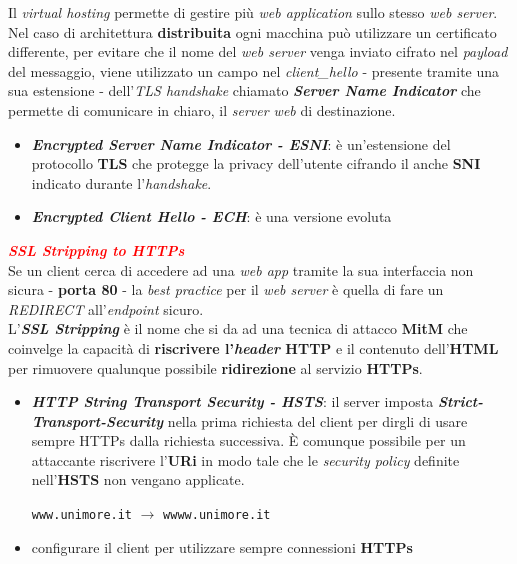 \begin{flushleft}
    Il \textit{virtual hosting} permette di gestire più \textit{web application} sullo stesso \textit{web server}. Nel caso di architettura \textbf{distribuita} ogni macchina può utilizzare un certificato differente, per evitare che il nome del \textit{web server} venga inviato cifrato nel \textit{payload} del messaggio, viene utilizzato un campo nel \textit{client\_hello} - presente tramite una sua estensione - dell'\textit{TLS handshake} chiamato \textbf{\textit{Server Name Indicator}} che permette di comunicare in chiaro, il \textit{server web} di destinazione.
    \begin{itemize}[nosep]
        \item \textbf{\textit{Encrypted Server Name Indicator - ESNI}}: è un'estensione del protocollo \textbf{TLS} che protegge la privacy dell'utente cifrando il anche \textbf{SNI} indicato durante l'\textit{handshake}.
        \item \textbf{\textit{Encrypted Client Hello - ECH}}: è una versione evoluta
    \end{itemize}
    
    \medskip

    \textcolor{red}{\textbf{\textit{SSL Stripping to HTTPs}}} \\
    Se un client cerca di accedere ad una \textit{web app} tramite la sua interfaccia non sicura - \textbf{porta 80} - la \textit{best practice} per il \textit{web server} è quella di fare un \textit{REDIRECT} all'\textit{endpoint} sicuro. \\
    L'\textbf{\textit{SSL Stripping}} è il nome che si da ad una tecnica di attacco \textbf{MitM} che coinvelge la capacità di \textbf{riscrivere l'\textit{header} HTTP} e il contenuto dell'\textbf{HTML} per rimuovere qualunque possibile \textbf{ridirezione} al servizio \textbf{HTTPs}.
    \begin{itemize}[nosep]
        \item \textbf{\textit{HTTP String Transport Security - HSTS}}: il server imposta \textbf{\textit{Strict-Transport-Security}} nella prima richiesta del client per dirgli di usare sempre HTTPs dalla richiesta successiva. È comunque possibile per un attaccante riscrivere l'\textbf{URi} in modo tale che le \textit{security policy} definite nell'\textbf{HSTS} non vengano applicate.
    
        {\centering
            \texttt{www.unimore.it} $\rightarrow$ \texttt{wwww.unimore.it}
        \par}

        \item configurare il client per utilizzare sempre connessioni \textbf{HTTPs}
    \end{itemize}
\end{flushleft}
